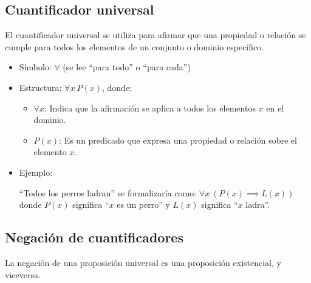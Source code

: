 \subsection{Cuantificador universal}

El cuantificador universal se utiliza para afirmar que una propiedad o relación se cumple para todos los elementos de un conjunto o dominio específico.

\begin{itemize}
	\item Símbolo: $\forall$ (se lee ``para todo'' o ``para cada'')
	\item Estructura: $\forall x \ P(x)$, donde:
	\begin{itemize}
		\item $\forall x$: Indica que la afirmación se aplica a todos los elementos $x$ en el dominio.
		\item $P(x)$: Es un predicado que expresa una propiedad o relación sobre el elemento $x$.
	\end{itemize}
	\item Ejemplo:
	
``Todos los perros ladran'' se formalizaría como: $\forall x \ \left(P(x) \implies L(x)\right)$ donde $P(x)$ significa ``$x$ es un perro'' y $L(x)$ significa ``$x$ ladra''.
\end{itemize}

\subsection{Negación de cuantificadores}
La negación de una proposición universal es una proposición existencial, y viceversa.


